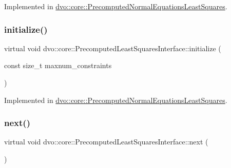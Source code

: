 Implemented in \mbox{\hyperlink{classdvo_1_1core_1_1_precomputed_normal_equations_least_squares_a3abc1c62317598bbbacf3b021d39bff3}{dvo\+::core\+::\+Precomputed\+Normal\+Equations\+Least\+Squares}}.

\mbox{\label{classdvo_1_1core_1_1_precomputed_least_squares_interface_abfd7276b663ea0afda8358a2ec9c96fe}} 
\subsubsection{\texorpdfstring{initialize()}{initialize()}}
{\footnotesize\ttfamily virtual void dvo\+::core\+::\+Precomputed\+Least\+Squares\+Interface\+::initialize (\begin{DoxyParamCaption}\item[{const size\+\_\+t}]{maxnum\+\_\+constraints }\end{DoxyParamCaption})\hspace{0.3cm}{\ttfamily [pure virtual]}}



Implemented in \mbox{\hyperlink{classdvo_1_1core_1_1_precomputed_normal_equations_least_squares_a51e5717e0add36b37db3617d35c87c87}{dvo\+::core\+::\+Precomputed\+Normal\+Equations\+Least\+Squares}}.

\mbox{\label{classdvo_1_1core_1_1_precomputed_least_squares_interface_a0ba3c8b938301387103912a9609a68dc}} 
\subsubsection{\texorpdfstring{next()}{next()}}
{\footnotesize\ttfamily virtual void dvo\+::core\+::\+Precomputed\+Least\+Squares\+Interface\+::next (\begin{DoxyParamCaption}{ }\end{DoxyParamCaption})\hspace{0.3cm}{\ttfamily [pure virtual]}}



